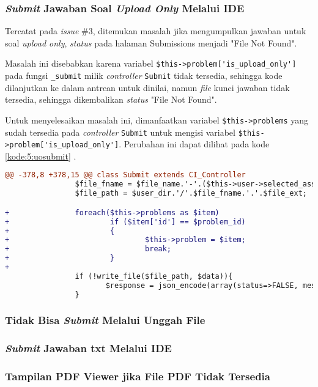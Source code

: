 \subsubsection{\textit{Submit} Jawaban Soal \textit{Upload Only} Melalui IDE}
Tercatat pada \textit{issue} \#3, ditemukan masalah jika mengumpulkan jawaban untuk soal \textit{upload only}, \textit{status} pada halaman Submissions menjadi "File Not Found".

Masalah ini disebabkan karena variabel \verb|$this->problem['is_upload_only']| pada fungsi \verb|_submit| milik \textit{controller} \verb|Submit| tidak tersedia, sehingga kode dilanjutkan ke dalam antrean untuk dinilai, namun \textit{file} kunci jawaban tidak tersedia, sehingga dikembalikan \textit{status} "File Not Found".

Untuk menyelesaikan masalah ini, dimanfaatkan variabel \verb|$this->problems| yang sudah tersedia pada \textit{controller} \verb|Submit| untuk mengisi variabel \verb|$this->problem['is_upload_only']|. Perubahan ini dapat dilihat pada kode \ref{kode:5:uosubmit} .

\begin{lstlisting}[language=diff, caption=Perubahan pada \texttt{Submit.php}, label=kode:5:uosubmit]
@@ -378,8 +378,15 @@ class Submit extends CI_Controller
                $file_fname = $file_name.'-'.($this->user->selected_assignment['total_submits']+1);
                $file_path = $user_dir.'/'.$file_fname.'.'.$file_ext;

+               foreach($this->problems as $item)
+                       if ($item['id'] == $problem_id)
+                       {
+                               $this->problem = $item;
+                               break;
+                       }
+
                if (!write_file($file_path, $data)){
                       $response = json_encode(array(status=>FALSE, message=>'Unable to submit'));
                }
\end{lstlisting}

\subsubsection{Tidak Bisa \textit{Submit} Melalui Unggah File}
\subsubsection{\textit{Submit} Jawaban txt Melalui IDE}
\subsubsection{Tampilan PDF Viewer jika File PDF Tidak Tersedia}

